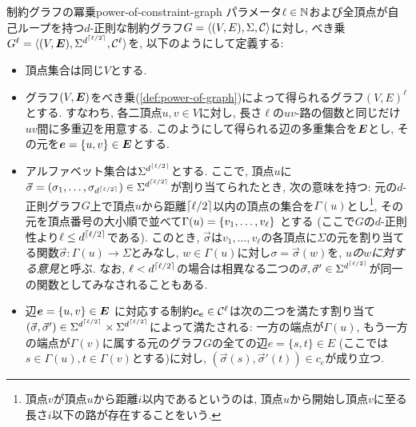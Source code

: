 \begin{definition}{制約グラフの冪乗}{power-of-constraint-graph}
  パラメータ$\ell\in\mathbb{N}$および全頂点が自己ループを持つ$d$-正則な制約グラフ$G=\langle(V,E),\Sigma,\mathcal{C}\rangle$に対し, べき乗$G^\ell = \langle(V,\boldsymbol{E}),\Sigma^{d^{\lceil\ell/2\rceil}},\mathcal{C}^\ell\rangle$を, 以下のようにして定義する:
  \begin{itemize}
    \item 頂点集合は同じ$V$とする.
    \item グラフ$(V,\boldsymbol{E})$をべき乗(\cref{def:power-of-graph})によって得られるグラフ$(V,E)^\ell$とする. すなわち, 各二頂点$u,v\in V$に対し, 長さ$\ell$の$uv$-路の個数と同じだけ$uv$間に多重辺を用意する. このようにして得られる辺の多重集合を$\boldsymbol{E}$とし, その元を$\boldsymbol{e} = \{u,v\} \in \boldsymbol{E}$とする.
    \item アルファベット集合は$\Sigma^{d^{\lceil\ell/2\rceil}}$とする. ここで, 頂点$u$に$\vec{\sigma}=(\sigma_1,\dots,\sigma_{d^{\lceil\ell/2\rceil}}) \in \Sigma^{d^{\lceil\ell/2\rceil}}$が割り当てられたとき, 次の意味を持つ: 元の$d$-正則グラフ$G$上で頂点$u$から距離$\lceil\ell/2\rceil$以内の頂点の集合を$\Gamma(u)$とし\footnote{頂点$v$が頂点$u$から距離$i$以内であるというのは, 頂点$u$から開始し頂点$v$に至る長さ$i$以下の路が存在することをいう.}, その元を頂点番号の大小順で並べて$\Gamma(u)=\qty{ v_1,\dots,v_\ell}$ とする (ここで$G$の$d$-正則性より$\ell \le d^{\lceil\ell/2\rceil}$である). このとき, $\vec{\sigma}$は$v_1,\dots,v_\ell$の各頂点に$\Sigma$の元を割り当てる関数$\vec{\sigma} \colon \Gamma(u)\to\Sigma$とみなし, $w\in\Gamma(u)$に対し$\sigma=\vec{\sigma}(w)$を, \emph{$u$の$w$に対する意見}と呼ぶ.
    なお, $\ell < d^{\lceil\ell/2\rceil}$の場合は相異なる二つの$\vec{\sigma},\vec{\sigma}'\in\Sigma^{d^{\lceil\ell/2\rceil}}$が同一の関数としてみなされることもある.
    \item 辺$\boldsymbol{e} = \{u,v\} \in \boldsymbol{E}$ に対応する制約$\boldsymbol{c}_{\boldsymbol{e}}\in \mathcal{C}^\ell$は次の二つを満たす割り当て$(\vec{\sigma},\vec{\sigma}')\in \Sigma^{d^{\lceil\ell/2\rceil}} \times \Sigma^{d^{\lceil\ell/2\rceil}}$によって満たされる:
    一方の端点が$\Gamma(u)$, もう一方の端点が$\Gamma(v)$に属する元のグラフ$G$の全ての辺$e=\{s,t\}\in E$ (ここでは$s\in\Gamma(u),t\in\Gamma(v)$とする)に対し, $(\vec{\sigma}(s), \vec{\sigma}'(t))\in c_e$が成り立つ.
  \end{itemize}
\end{definition}


